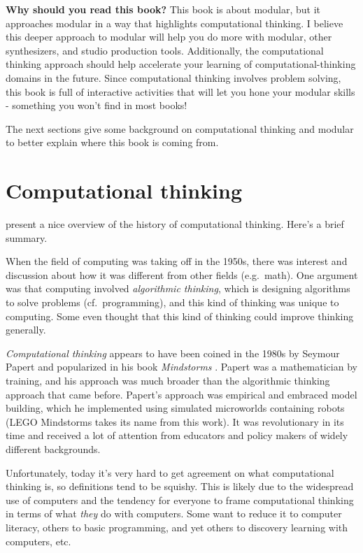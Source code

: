 \documentclass[
]{book}
\begin{document}
\textbf{Why should you read this book?}
This book is about modular, but it approaches modular in a way that highlights computational thinking.
I believe this deeper approach to modular will help you do more with modular, other synthesizers, and studio production tools.
Additionally, the computational thinking approach should help accelerate your learning of computational-thinking domains in the future.
Since computational thinking involves problem solving, this book is full of interactive activities that will let you hone your modular skills - something you won't find in most books!

The next sections give some background on computational thinking and modular to better explain where this book is coming from.

\hypertarget{computational-thinking}{%
\section{Computational thinking}\label{computational-thinking}}

\citet{Tedre2016} present a nice overview of the history of computational thinking.
Here's a brief summary.

When the field of computing was taking off in the 1950s, there was interest and discussion about how it was different from other fields (e.g.~math).
One argument was that computing involved \emph{algorithmic thinking}, which is designing algorithms to solve problems (cf.~programming), and this kind of thinking was unique to computing.
Some even thought that this kind of thinking could improve thinking generally.

\emph{Computational thinking} appears to have been coined in the 1980s by Seymour Papert and popularized in his book \emph{Mindstorms} \citep{Papert1980}.
Papert was a mathematician by training, and his approach was much broader than the algorithmic thinking approach that came before.
Papert's approach was empirical and embraced model building, which he implemented using simulated microworlds containing robots (LEGO Mindstorms takes its name from this work).
It was revolutionary in its time and received a lot of attention from educators and policy makers of widely different backgrounds.

Unfortunately, today it's very hard to get agreement on what computational thinking is, so definitions tend to be squishy.
This is likely due to the widespread use of computers and the tendency for everyone to frame computational thinking in terms of what \emph{they} do with computers.
Some want to reduce it to computer literacy, others to basic programming, and yet others to discovery learning with computers, etc.
\end{document}
